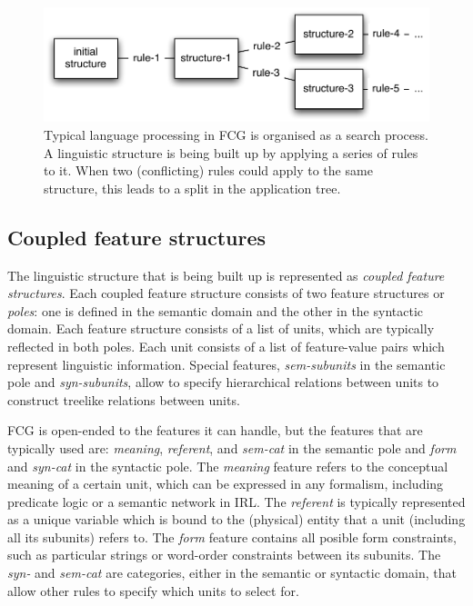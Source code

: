 \begin{figure}[htbp]
  \begin{center}
    \includegraphics[width=.8\textwidth]{./frameworks/figures/fcg-search.pdf}
    \caption[Application of a rule-set]{Typical language processing in
      FCG is organised as a search process. A linguistic structure is
      being built up by applying a series of rules to it. When two
      (conflicting) rules could apply to the same structure, this
      leads to a split in the application tree.}
    \label{f:fcg-search}
  \end{center}
\end{figure}

\subsection{Coupled feature structures}
\label{s:coupled-feature-structures}

The linguistic structure that is being built up is represented as
\emph{coupled feature structures}. Each coupled feature structure
consists of two feature structures or \emph{poles}: one is defined in
the semantic domain and the other in the syntactic domain. Each
feature structure consists of a list of units, which are typically
reflected in both poles. Each unit consists of a list of feature-value
pairs which represent linguistic information. Special features,
\emph{sem-subunits} in the semantic pole and \emph{syn-subunits},
allow to specify hierarchical relations between units to construct
treelike relations between units.

FCG is open-ended to the features it can handle, but the features that
are typically used are: \emph{meaning}, \emph{referent}, and
\emph{sem-cat} in the semantic pole and \emph{form} and \emph{syn-cat}
in the syntactic pole. The \emph{meaning} feature refers to the
conceptual meaning of a certain unit, which can be expressed in any
formalism, including predicate logic or a semantic network in IRL. The
\emph{referent} is typically represented as a unique variable which is
bound to the (physical) entity that a unit (including all its
subunits) refers to. The \emph{form} feature contains all posible form
constraints, such as particular strings or word-order constraints
between its subunits. The \emph{syn-} and \emph{sem-cat} are
categories, either in the semantic or syntactic domain, that allow
other rules to specify which units to select for.

